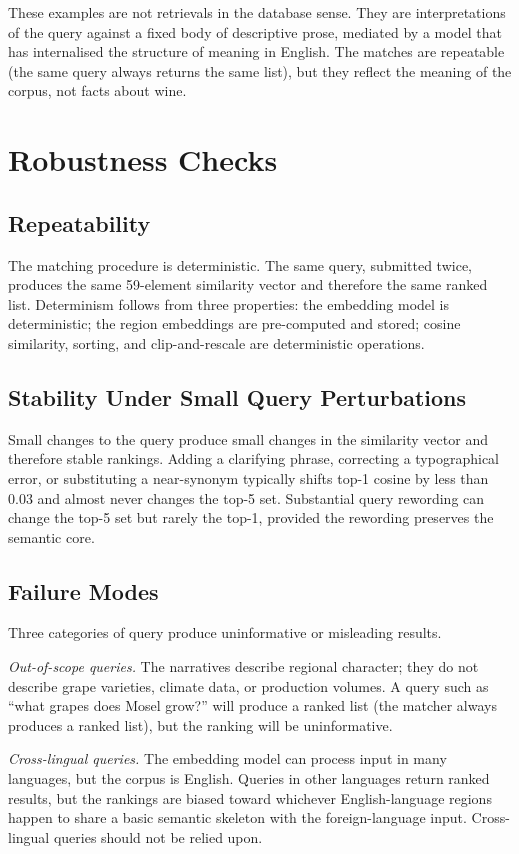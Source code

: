\documentclass[11pt]{article}
\begin{document}
These examples are not retrievals in the database sense. They are interpretations of the query against a fixed body of descriptive prose, mediated by a model that has internalised the structure of meaning in English. The matches are repeatable (the same query always returns the same list), but they reflect the meaning of the corpus, not facts about wine.

\section{Robustness Checks}

\subsection{Repeatability}
The matching procedure is deterministic. The same query, submitted twice, produces the same 59-element similarity vector and therefore the same ranked list. Determinism follows from three properties: the embedding model is deterministic; the region embeddings are pre-computed and stored; cosine similarity, sorting, and clip-and-rescale are deterministic operations.

\subsection{Stability Under Small Query Perturbations}
Small changes to the query produce small changes in the similarity vector and therefore stable rankings. Adding a clarifying phrase, correcting a typographical error, or substituting a near-synonym typically shifts top-1 cosine by less than 0.03 and almost never changes the top-5 set. Substantial query rewording can change the top-5 set but rarely the top-1, provided the rewording preserves the semantic core.

\subsection{Failure Modes}
Three categories of query produce uninformative or misleading results.

\textit{Out-of-scope queries.} The narratives describe regional character; they do not describe grape varieties, climate data, or production volumes. A query such as ``what grapes does Mosel grow?'' will produce a ranked list (the matcher always produces a ranked list), but the ranking will be uninformative.

\textit{Cross-lingual queries.} The embedding model can process input in many languages, but the corpus is English. Queries in other languages return ranked results, but the rankings are biased toward whichever English-language regions happen to share a basic semantic skeleton with the foreign-language input. Cross-lingual queries should not be relied upon.
\end{document}
